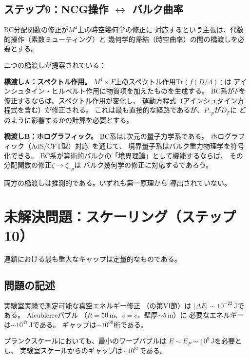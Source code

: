 \documentclass[11pt,a4paper]{article}
\newcommand{\Tr}{\mathrm{Tr}}
\begin{document}
\subsection{ステップ9：NCG操作 $\leftrightarrow$ バルク曲率}

BC分配関数の修正が$M^4$上の時空幾何学の修正に
対応するという主張は、代数的操作（素数ミューティング）と
幾何学的帰結（時空曲率）の間の橋渡しを必要とする。

二つの橋渡しが提案されている：

\textbf{橋渡しA：スペクトル作用。}
$M^4 \times F$上のスペクトル作用$\Tr(f(D/\Lambda))$は
アインシュタイン・ヒルベルト作用に物質項を加えたものを生成する。
BC系が$F$を修正するならば、スペクトル作用が変化し、
運動方程式（アインシュタイン方程式を含む）が修正される。
これは最も直接的な経路であるが、$P_{\neg p}$が$D_F$に
どのように影響するかの計算を必要とする。

\textbf{橋渡しB：ホログラフィック。}
BC系は1次元の量子力学系である。
ホログラフィック（AdS/CFT型）対応~\cite{Maldacena1998}を通じて、
境界量子系はバルク重力物理学を符号化できる。
BC系が算術的バルクの「境界理論」として機能するならば、
その分配関数の修正$\zeta \to \zeta_{\neg p}$は
バルク幾何学の修正に対応するであろう。

両方の橋渡しは推測的である。いずれも第一原理から
導出されていない。

\section{未解決問題：スケーリング（ステップ10）}
\label{sec:scaling}

連鎖における最も重大なギャップは定量的なものである。

\subsection{問題の記述}

実験室実験で測定可能な真空エネルギー修正
（\cite{paper_A}の第VI節）は
$|\Delta E| \sim 10^{-22}\,\mathrm{J}$である。
Alcubierreバブル
（$R = 50\,\mathrm{m}$、$v = c$、壁厚$\sim 5\,\mathrm{m}$）に
必要なエネルギーは$\sim 10^{47}\,\mathrm{J}$である。
ギャップは$\sim 10^{69}$桁である。

プランクスケールにおいても、最小のワープバブルは
$E \sim E_P \sim 10^9\,\mathrm{J}$を必要とし、
実験室スケールからのギャップは$\sim 10^{31}$である。
\end{document}
